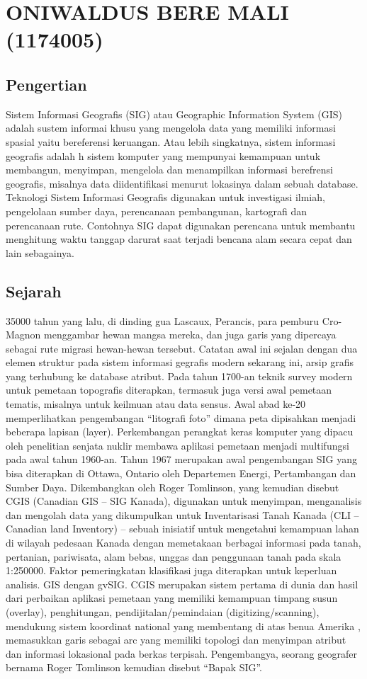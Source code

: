 \section{ONIWALDUS BERE MALI (1174005)}
\subsection{Pengertian}
Sistem Informasi Geografis (SIG) atau Geographic Information System (GIS) adalah sustem informai khusu yang mengelola data yang memiliki informasi spasial yaitu bereferensi keruangan. Atau lebih singkatnya, sistem informasi geografis adalah h sistem komputer yang mempunyai kemampuan untuk membangun, menyimpan, mengelola dan menampilkan informasi berefrensi geografis, misalnya data diidentifikasi menurut lokasinya dalam sebuah database.
Teknologi Sistem Informasi Geografis digunakan untuk investigasi ilmiah, pengelolaan sumber daya, perencanaan pembangunan, kartografi dan perencanaan rute. Contohnya SIG dapat digunakan perencana untuk membantu menghitung waktu tanggap darurat saat terjadi bencana alam secara cepat dan lain sebagainya.

\subsection{Sejarah}
35000 tahun yang lalu, di dinding gua Lascaux, Perancis, para pemburu Cro-Magnon menggambar hewan mangsa mereka, dan juga garis yang dipercaya sebagai rute migrasi hewan-hewan tersebut. Catatan awal ini sejalan dengan dua elemen struktur pada sistem informasi gegrafis modern sekarang ini, arsip grafis yang terhubung ke database atribut.
Pada tahun 1700-an teknik survey modern untuk pemetaan topografis diterapkan, termasuk juga versi awal pemetaan tematis, misalnya untuk keilmuan atau data sensus.
Awal abad ke-20 memperlihatkan pengembangan “litografi foto” dimana peta dipisahkan menjadi beberapa lapisan (layer). Perkembangan perangkat keras komputer yang dipacu oleh penelitian senjata nuklir membawa aplikasi pemetaan menjadi multifungsi pada awal tahun 1960-an.
Tahun 1967 merupakan awal pengembangan SIG yang bisa diterapkan di Ottawa, Ontario oleh Departemen Energi, Pertambangan dan Sumber Daya. Dikembangkan oleh Roger Tomlinson, yang kemudian disebut CGIS (Canadian GIS – SIG Kanada), digunakan untuk menyimpan, menganalisis dan mengolah data yang dikumpulkan untuk Inventarisasi Tanah Kanada (CLI – Canadian land Inventory) – sebuah inisiatif untuk mengetahui kemampuan lahan di wilayah pedesaan Kanada dengan memetakaan berbagai informasi pada tanah, pertanian, pariwisata, alam bebas, unggas dan penggunaan tanah pada skala 1:250000. Faktor pemeringkatan klasifikasi juga diterapkan untuk keperluan analisis.
GIS dengan gvSIG.
CGIS merupakan sistem pertama di dunia dan hasil dari perbaikan aplikasi pemetaan yang memiliki kemampuan timpang susun (overlay), penghitungan, pendijitalan/pemindaian (digitizing/scanning), mendukung sistem koordinat national yang membentang di atas benua Amerika , memasukkan garis sebagai arc yang memiliki topologi dan menyimpan atribut dan informasi lokasional pada berkas terpisah. Pengembangya, seorang geografer bernama Roger Tomlinson kemudian disebut “Bapak SIG”.


